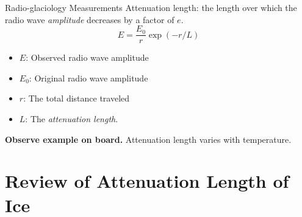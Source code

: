 \documentclass{beamer}
\begin{document}
\begin{frame}{Radio-glaciology Measurements}
\small
Attenuation length: the length over which the radio wave \textit{amplitude} decreases by a factor of $e$.
\begin{equation}
E = \frac{E_0}{r} \exp(-r/L)
\end{equation}
\begin{itemize}
\item $E$: Observed radio wave amplitude
\item $E_0$: Original radio wave amplitude
\item $r$: The total distance traveled
\item $L$: The \textit{attenuation length}.
\end{itemize}
\textbf{Observe example on board.}  Attenuation length varies with temperature.
\end{frame}

\section{Review of Attenuation Length of Ice}
\end{document}
